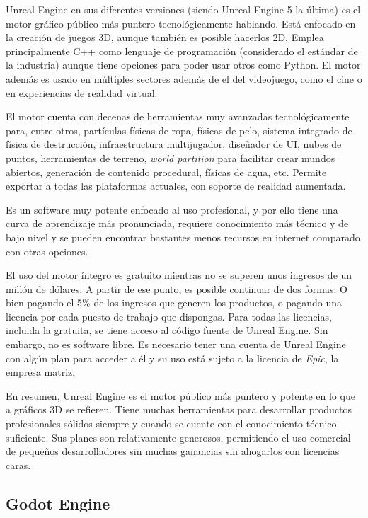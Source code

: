 Unreal Engine en sus diferentes versiones (siendo Unreal Engine 5 la última) es el motor gráfico público más puntero tecnológicamente hablando. Está enfocado en la creación de juegos 3D, aunque también es posible hacerlos 2D. Emplea principalmente C++ como lenguaje de programación (considerado el estándar de la industria) aunque tiene opciones para poder usar otros como Python. El motor además es usado en múltiples sectores además de el del videojuego, como el cine o en experiencias de realidad virtual.

El motor cuenta con decenas de herramientas muy avanzadas tecnológicamente para, entre otros, partículas físicas de ropa, físicas de pelo, sistema integrado de física de destrucción, infraestructura multijugador, diseñador de UI, nubes de puntos, herramientas de terreno, \textit{world partition} para facilitar crear mundos abiertos, generación de contenido procedural, físicas de agua, etc. Permite exportar a todas las plataformas actuales, con soporte de realidad aumentada.

Es un software muy potente enfocado al uso profesional, y por ello tiene una curva de aprendizaje más pronunciada, requiere conocimiento más técnico y de bajo nivel y se pueden encontrar bastantes menos recursos en internet comparado con otras opciones.

El uso del motor íntegro es gratuito mientras no se superen unos ingresos de un millón de dólares. A partir de ese punto, es posible continuar de dos formas. O bien pagando el 5\% de los ingresos que generen los productos, o pagando una licencia por cada puesto de trabajo que dispongas. Para todas las licencias, incluida la gratuita, se tiene acceso al código fuente de Unreal Engine. Sin embargo, no es software libre. Es necesario tener una cuenta de Unreal Engine con algún plan para acceder a él y su uso está sujeto a la licencia de \textit{Epic}, la empresa matriz.

En resumen, Unreal Engine es el motor público más puntero y potente en lo que a gráficos 3D se refieren. Tiene muchas herramientas para desarrollar productos profesionales sólidos siempre y cuando se cuente con el conocimiento técnico suficiente. Sus planes son relativamente generosos, permitiendo el uso comercial de pequeños desarrolladores sin muchas ganancias sin ahogarlos con licencias caras.

\subsection{Godot Engine}

